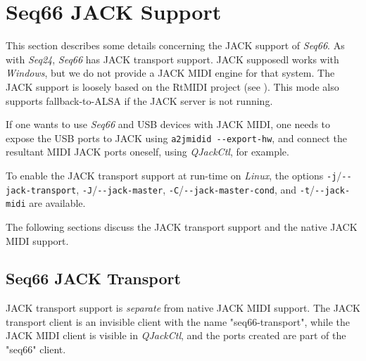 %
%
%

\section{Seq66 JACK Support}
\label{sec:jack}

   This section describes some details concerning the JACK support of
   \textsl{Seq66}.
   As with \textsl{Seq24}, \textsl{Seq66} has JACK transport support.
   JACK supposedl works with \textsl{Windows}, but we do not provide a JACK
   MIDI engine for that system.
   The JACK support is loosely based on the RtMIDI project
   (see \cite{rtmidi}).
   This mode also supports fallback-to-ALSA if the JACK
   server is not running.

   If one wants to use \textsl{Seq66} and USB devices
   with JACK MIDI, one needs to expose the USB ports to JACK using
   \texttt{a2jmidid -{}-export-hw}, and connect the resultant MIDI JACK ports
   oneself, using \textsl{QJackCtl}, for example.

   To enable the JACK transport support at run-time on
   \textsl{Linux}, the options
   \texttt{-j}/\texttt{-{}-jack-transport},
   \texttt{-J}/\texttt{-{}-jack-master},
   \texttt{-C}/\texttt{-{}-jack-master-cond},
   and \texttt{-t}/\texttt{-{}-jack-midi} are available.

   The following sections discuss the JACK transport support and the native
   JACK MIDI support.

\subsection{Seq66 JACK Transport}
\label{subsec:jack_transport}

   JACK transport support is \textsl{separate} from native JACK MIDI support.
   The JACK transport client is an invisible client with the
   name "seq66-transport", while the JACK MIDI client is visible in
   \textsl{QJackCtl}, and the ports created are part of the
   "seq66" client.

